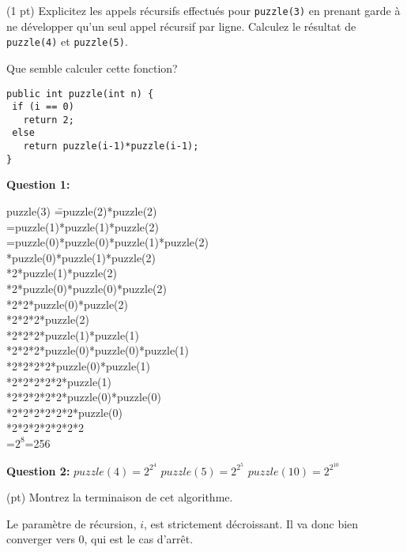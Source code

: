 \documentclass[10pt]{article}\usepackage[correction,nu]{esial}
\begin{document}
\noindent\begin{minipage}{.65\linewidth}
  \Question(1 pt) Explicitez les appels récursifs effectués pour 
  \texttt{puzzle(3)} en prenant garde à ne développer qu'un seul appel récursif
  par ligne. 
  Calculez le résultat de \texttt{puzzle(4)} et \texttt{puzzle(5)}.

  Que semble calculer cette fonction?

\end{minipage}\hfill
\begin{minipage}{.33\linewidth}
\begin{Verbatim}[numbers=right]
public int puzzle(int n) {
 if (i == 0)     
   return 2;
 else 
   return puzzle(i-1)*puzzle(i-1);
}
\end{Verbatim}
\end{minipage}

\begin{Reponse}
\noindent\textbf{Question 1:}
\begin{tabbing}
  puzzle(3) \==puzzle(2)*puzzle(2)\\
  \>=puzzle(1)*puzzle(1)*puzzle(2)\\
  \>=puzzle(0)*puzzle(0)*puzzle(1)*puzzle(2)\\
  *puzzle(0)*puzzle(1)*puzzle(2)\\
  *2*puzzle(1)*puzzle(2)\\
  *2*puzzle(0)*puzzle(0)*puzzle(2)\\
  *2*2*puzzle(0)*puzzle(2)\\
  *2*2*2*puzzle(2)\\
  *2*2*2*puzzle(1)*puzzle(1)\\
  *2*2*2*puzzle(0)*puzzle(0)*puzzle(1)\\
  *2*2*2*2*puzzle(0)*puzzle(1)\\
  *2*2*2*2*2*puzzle(1)\\
  *2*2*2*2*2*puzzle(0)*puzzle(0)\\
  *2*2*2*2*2*2*puzzle(0)\\
  *2*2*2*2*2*2*2\\
  \>=$2^8$=256
\end{tabbing}
\noindent\textbf{Question 2:} 
$puzzle(4)=2^{2^4}$ $puzzle(5)=2^{2^5}$ $puzzle(10)=2^{2^{10}}$

\end{Reponse}

\Question(\textonehalf pt)  Montrez la terminaison de cet algorithme.

\begin{Reponse}
  Le paramètre de récursion, $i$, est strictement décroissant. Il va donc bien
  converger vers 0, qui est le cas d'arrêt.
\end{Reponse}
\end{document}
